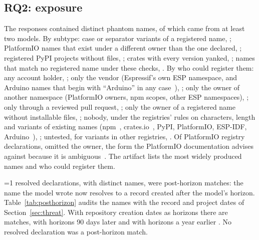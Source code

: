 \documentclass[conference]{IEEEtran}
\providecommand{\rHasPostHorizon}{0}\providecommand{\rHasValidation}{0}\providecommand{\rHasLookups}{0}\providecommand{\rHasKappa}{0}\providecommand{\rValAllIdentical}{0}\providecommand{\rExMasked}{0}\providecommand{\rSweepSame}{0}\providecommand{\rSqOptEqAge}{0}
\begin{document}
\subsection{RQ2: exposure}
The responses contained \rNUniquePhantom{} distinct phantom names, of which \rNCrossModel{} came from at least two
models. By subtype: case or separator variants of a registered name, \rNSepVariant; PlatformIO names that exist under
a different owner than the one declared, \rNOwnerMismatch; registered PyPI projects without files, \rNNoFiles; crates
with every version yanked, \rNYanked; names that match no registered name under these checks, \rNInvented. By who
could register them: any account holder, \rNOpenSquat; only the vendor (Espressif's own ESP namespace, and
Arduino names that begin with ``Arduino'' in any case~\cite{arduinoregistry,arduinolint}), \rNVendorSquat; only the
owner of another namespace (PlatformIO owners, npm scopes, other ESP namespaces), \rNNsSquat; only through a reviewed
pull request, \rNCuratedSquat; only the owner of a registered name without installable files, \rNOwnedSquat; nobody,
under the registries' rules on characters, length and variants of existing names (npm~\cite{npmnames,npmmoniker},
crates.io~\cite{cratesiocanon}, PyPI, PlatformIO, ESP-IDF, Arduino~\cite{arduinoregistry,arduinolint}), \rNBlockedSquat; untested, for
variants in other registries, \rNVariantSquat. Of \rPioAll{} PlatformIO registry
declarations, \rPioBare{} omitted the owner, the form the PlatformIO documentation advises against because it is
ambiguous~\cite{piodeps}. The artifact lists the most widely produced names and who could register them.

\ifnum\rHasPostHorizon=1
\rNPostHorizon{} resolved declarations, with \rNPostHorizonNames{} distinct names, were post-horizon matches: the name
the model wrote now resolves to a record created after the model's horizon. Table~\ref{tab:posthorizon} audits the
names with the record and project dates of Section~\ref{sec:threat}. \ifnum{}\rAuditSummary\fi{} With repository creation dates as horizons there are
\rNPostHorizonCreated{} matches, with horizons 90 days later \rNPostHorizonLater{} and with horizons a year earlier
\rNPostHorizonEarlierYear.
\else
No resolved declaration was a post-horizon match.
\fi
\end{document}
